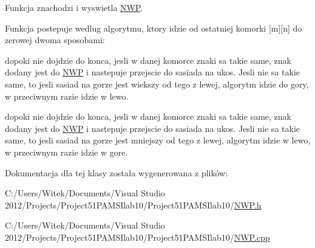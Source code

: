 Funkcja znachodzi i wyswietla \hyperlink{class_n_w_p}{N\-W\-P}. 

Funkcja postepuje wedlug algorytmu, ktory idzie od ostatniej komorki \mbox{[}m\mbox{]}\mbox{[}n\mbox{]} do zerowej dwoma sposobami\-:
\begin{DoxyEnumerate}
\item dopoki nie dojdzie do konca, jesli w danej komorce znaki sa takie same, znak dodany jest do \hyperlink{class_n_w_p}{N\-W\-P} i nastepuje przejscie do sasiada na ukos. Jesli nie sa takie same, to jesli sasiad na gorze jest wiekszy od tego z lewej, algorytm idzie do gory, w przeciwnym razie idzie w lewo.
\item dopoki nie dojdzie do konca, jesli w danej komorce znaki sa takie same, znak dodany jest do \hyperlink{class_n_w_p}{N\-W\-P} i nastepuje przejscie do sasiada na ukos. Jesli nie sa takie same, to jesli sasiad na gorze jest mniejszy od tego z lewej, algorytm idzie w lewo, w przeciwnym razie idzie w gore. 
\end{DoxyEnumerate}

Dokumentacja dla tej klasy została wygenerowana z plików\-:\begin{DoxyCompactItemize}
\item 
C\-:/\-Users/\-Witek/\-Documents/\-Visual Studio 2012/\-Projects/\-Project51\-P\-A\-M\-S\-Ilab10/\-Project51\-P\-A\-M\-S\-Ilab10/\hyperlink{_n_w_p_8h}{N\-W\-P.\-h}\item 
C\-:/\-Users/\-Witek/\-Documents/\-Visual Studio 2012/\-Projects/\-Project51\-P\-A\-M\-S\-Ilab10/\-Project51\-P\-A\-M\-S\-Ilab10/\hyperlink{_n_w_p_8cpp}{N\-W\-P.\-cpp}\end{DoxyCompactItemize}
